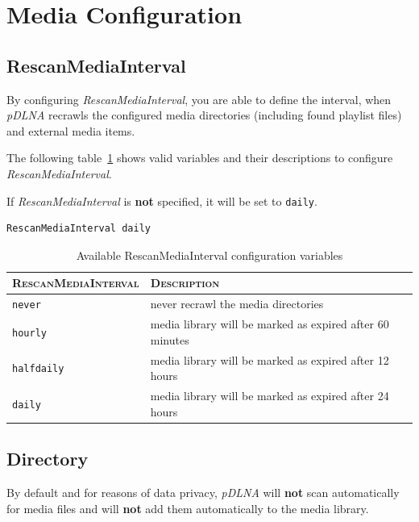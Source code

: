 \documentclass[a4paper,oneside,10pt]{report}
\newenvironment{colframefile}{%
  \begin{Sbox}
    \begin{minipage}{.99\columnwidth}
}{%
  \end{minipage}
  \end{Sbox}
  \begin{center}
    \fcolorbox{black}{Yellow}{\TheSbox}
  \end{center}
}
\begin{document}
\section{Media Configuration}

\subsection{RescanMediaInterval}

By configuring {\em RescanMediaInterval}, you are able to define the interval, when {\em pDLNA} recrawls the configured media directories (including found playlist files) and external media items.

The following table~\ref{tab:RescanMediaIntervalyParams} shows valid variables and their descriptions to configure {\em RescanMediaInterval}.

If {\em RescanMediaInterval} is \textbf{not} specified, it will be set to \verb|daily|.

\begin{colframefile}
\begin{verbatim}
RescanMediaInterval daily
\end{verbatim}
\end{colframefile}

\begin{table}
	\centering
	\begin{tabular}{|p{12em}|p{20em}|}
		\hline
		\textsc{RescanMediaInterval} & \textsc{Description}\\
		\hline
		\hline
		\verb|never| & never recrawl the media directories \\
		\hline
		\verb|hourly| & media library will be marked as expired after 60 minutes \\
		\hline
		\verb|halfdaily| & media library will be marked as expired after 12 hours \\
		\hline
		\verb|daily| & media library will be marked as expired after 24 hours \\
		\hline
	\end{tabular}
	\caption{Available RescanMediaInterval configuration variables}
	\label{tab:RescanMediaIntervalyParams}
\end{table}

\subsection{Directory}
\label{configDirectory}

By default and for reasons of data privacy, {\em pDLNA} will \textbf{not} scan automatically for media files and will \textbf{not} add them automatically to the media library.
\end{document}
